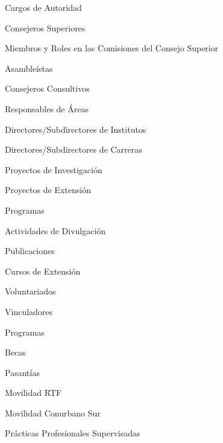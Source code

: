 \item Cargos de Autoridad
\item Consejeros Superiores
\item Miembros y Roles en las Comisiones del Consejo Superior
\item Asambleístas
\item Consejeros Consultivos
\item Responsables de Áreas
\item Directores/Subdirectores de Institutos
\item Directores/Subdirectores de Carreras
\item Proyectos de Investigación
\item Proyectos de Extensión
\item Programas
\item Actividades de Divulgación
\item Publicaciones
\item Cursos de Extensión
\item Voluntariados
\item Vinculadores
\item Programas
\item Becas
\item Pasantías
\item Movilidad RTF
\item Movilidad Conurbano Sur
\item Prácticas Profesionales Supervisadas
